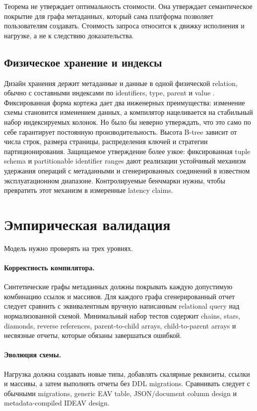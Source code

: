 \documentclass[11pt]{article}
\begin{document}
Теорема не утверждает оптимальность стоимости. Она утверждает семантическое
покрытие для графа метаданных, который сама платформа позволяет пользователям
создавать. Стоимость запроса относится к движку исполнения и нагрузке, а не к
следствию доказательства.

\subsection{Физическое хранение и индексы}

Дизайн хранения держит метаданные и данные в одной физической relation, обычно
с составными индексами по identifiers, type, parent и value
\citep{integramWorkflow2026}. Фиксированная форма кортежа дает два инженерных
преимущества: изменение схемы становится изменением данных, а компилятор
нацеливается на стабильный набор индексируемых колонок. Но было бы неверно
утверждать, что это само по себе гарантирует постоянную производительность.
Высота B-tree зависит от числа строк, размера страницы, распределения ключей и
стратегии партиционирования. Защищаемое утверждение более узкое: фиксированная
tuple schema и partitionable identifier ranges дают реализации устойчивый
механизм удержания операций с метаданными и сгенерированных соединений в
известном эксплуатационном диапазоне. Контролируемые бенчмарки нужны, чтобы
превратить этот механизм в измеренные latency claims.

\section{Эмпирическая валидация}

Модель нужно проверять на трех уровнях.

\paragraph{Корректность компилятора.}
Синтетические графы метаданных должны покрывать каждую допустимую комбинацию
ссылок и массивов. Для каждого графа сгенерированный отчет следует сравнить с
эквивалентным вручную написанным relational query над нормализованной схемой.
Минимальный набор тестов содержит chains, stars, diamonds, reverse references,
parent-to-child arrays, child-to-parent arrays и несвязные отчеты, которые
обязаны завершаться ошибкой.

\paragraph{Эволюция схемы.}
Нагрузка должна создавать новые типы, добавлять скалярные реквизиты, ссылки и
массивы, а затем выполнять отчеты без DDL migrations. Сравнивать следует с
обычными migrations, generic EAV table, JSON/document column design и
metadata-compiled IDEAV design.
\end{document}
